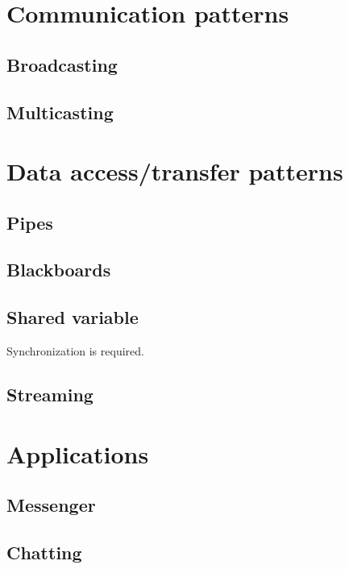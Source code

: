 \documentclass{note}
\begin{document}
\section{Communication patterns}
\subsection{Broadcasting}
\subsection{Multicasting}

\section{Data access/transfer patterns}
\subsection{Pipes}
\subsection{Blackboards}
\subsection{Shared variable}
Synchronization is required.
\subsection{Streaming}

\section{Applications}
\subsection{Messenger}
\subsection{Chatting}


\nocite{HW03,RHAM06,RHEA04a,RHEA04b,BDH05}
\end{document}
